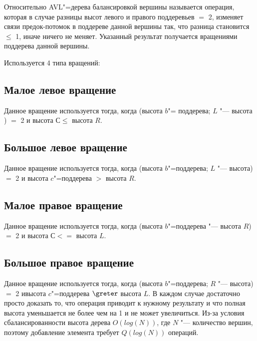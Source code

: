 Относительно AVL"=дерева балансировкой вершины называется операция,
которая в случае разницы высот левого и правого поддеревьев $=$ 2,
изменяет связи предок-потомок в поддереве данной вершины так,
что разница становится $ \leqslant $ 1, иначе ничего не меняет.
Указанный результат получается вращениями поддерева данной вершины.

Используется 4 типа вращений:

\subsection*{Малое левое вращение}


Данное вращение используется тогда,
когда (высота $b$"= поддерева; $L$ "--- высота )
$=$ 2 и высота $С \leqslant$ высота $R$.

\subsection*{Большое левое вращение}


Данное вращение используется тогда,
когда (высота $b$"=поддерева; $L$ "--- высота)
$=$ 2 и высота $c$"=поддерева $>$ высота $R$.

\subsection*{Малое правое вращение}


Данное вращение используется тогда,
когда (высота $b$"=поддерева "--- высота $R$)
$=$ 2 и высота $С <=$ высота $L$.

\subsection*{Большое правое вращение}


Данное вращение используется тогда, когда (высота $b$"=поддерева; $R$ "--- высота)
$=$ 2 ивысота $c$"=поддерева $ \greter $ высота $L$.
В каждом случае достаточно просто доказать то, что операция приводит к нужному результату и
что полная высота уменьшается не более чем на 1 и не может увеличиться.
Из-за условия сбалансированности высота дерева $O(log(N))$,
где $N$ "--- количество вершин, поэтому добавление элемента требует $Q(log(N))$ операций.